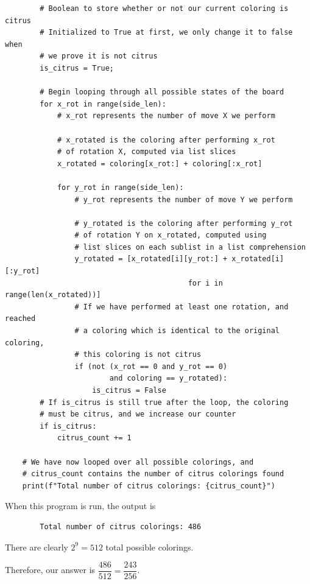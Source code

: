 \documentclass[12pt]{article}
\begin{document}
\begin{solution}{2}
\begin{lstlisting}
        # Boolean to store whether or not our current coloring is citrus
        # Initialized to True at first, we only change it to false when
        # we prove it is not citrus
        is_citrus = True;
        
        # Begin looping through all possible states of the board
        for x_rot in range(side_len):
            # x_rot represents the number of move X we perform
        
            # x_rotated is the coloring after performing x_rot
            # of rotation X, computed via list slices
            x_rotated = coloring[x_rot:] + coloring[:x_rot]
        
            for y_rot in range(side_len):
                # y_rot represents the number of move Y we perform
        
                # y_rotated is the coloring after performing y_rot
                # of rotation Y on x_rotated, computed using
                # list slices on each sublist in a list comprehension
                y_rotated = [x_rotated[i][y_rot:] + x_rotated[i][:y_rot]
                                          for i in range(len(x_rotated))]
                # If we have performed at least one rotation, and reached
                # a coloring which is identical to the original coloring,
                # this coloring is not citrus
                if (not (x_rot == 0 and y_rot == 0)
                        and coloring == y_rotated):
                    is_citrus = False
        # If is_citrus is still true after the loop, the coloring
        # must be citrus, and we increase our counter
        if is_citrus:
            citrus_count += 1

    # We have now looped over all possible colorings, and
    # citrus_count contains the number of citrus colorings found
    print(f"Total number of citrus colorings: {citrus_count}")
\end{lstlisting}

    When this program is run, the output is
    \begin{verbatim}
        Total number of citrus colorings: 486
    \end{verbatim}
    
    There are clearly $2^9=512$ total possible colorings.
    
    Therefore, our answer is $\dfrac{486}{512} = \boxed{\dfrac{243}{256}}$.
 
    
\end{solution}
\end{document}
